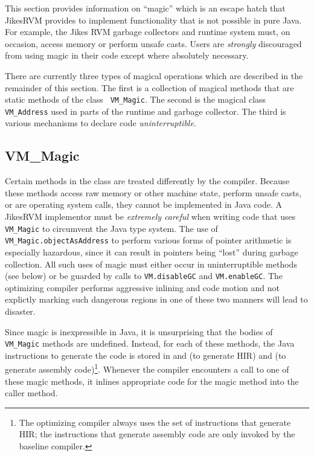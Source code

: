 This section provides information on ``magic'' which is an escape
hatch that Jikes\trademark RVM provides to implement
functionality that is not 
possible in pure Java\trademark.  For example, the Jikes RVM garbage
collectors and 
runtime system must, on occasion, access memory or perform unsafe
casts.  Users are {\it strongly} discouraged from using magic in their code
except where absolutely necessary.  

There are currently three types of magical operations which are
described in the remainder of this section.  The first is a collection
of magical methods that are static methods of the class {\tt
VM\_Magic}.  The second is the magical class {\tt VM\_Address} used in
parts of the runtime and garbage collector. The third is various
mechanisms to declare code {\em uninterruptible}.

\subsection{VM\_Magic}
Certain methods in the class  are
treated differently by the compiler. Because these methods access raw
memory or other machine state, perform unsafe casts, or are operating
system calls, they cannot be implemented in Java code.  A
Jikes\trademark RVM implementor must be {\em extremely careful} when
writing code that uses {\tt VM\_Magic} to circumvent the Java type
system.  The use of {\tt VM\_Magic.objectAsAddress} to perform various
forms of pointer arithmetic is especially hazardous, since it can
result in pointers being ``lost'' during garbage collection.  All such
uses of magic must either occur in uninterruptible methods (see below)
or be guarded by calls to {\tt VM.disableGC} and {\tt VM.enableGC}.
The optimizing compiler performs aggressive inlining and code motion
and not explictly marking such dangerous regions in one of these two
manners will lead to disaster.

Since magic is inexpressible in Java, it is unsurprising that the
bodies of {\tt VM\_Magic} methods are undefined.  Instead, for each of
these methods, the Java instructions to generate the code is stored in
 and 
 (to generate HIR) and 
 (to generate assembly code)\footnote{The optimizing
compiler always uses the set of instructions that generate HIR; the
instructions that generate assembly code are only invoked by the
baseline compiler.}.  Whenever the compiler encounters a call to one of these
magic methods, it inlines appropriate code for the magic method into the caller method.

